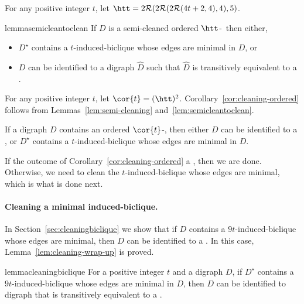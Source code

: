 For any positive integer $t$, let $\htt=2\mathcal{R}(2\mathcal{R}(2\mathcal{R}(4t+2,4),4),5)$.

\begin{restatable}{lemma}{semicleantoclean}
\label{lem:semicleantoclean}
If $D$ is a semi-cleaned ordered $\htt$-\toughpair\ 
then either, 
\begin{itemize}
\item $D^{\star}$ contains a $t$-induced-biclique whose edges are minimal in $D$, or
\item $D$ can be identified to a digraph $\hat{D}$ such that $\hat{D}$ is transitively equivalent to a .
\end{itemize}
\end{restatable}

For any positive integer $t$, let $\cor{t}= (\htt)^2$.
Corollary~\ref{cor:cleaning-ordered} follows from Lemmas~\ref{lem:semi-cleaning} and~\ref{lem:semicleantoclean}.

\begin{corollary}\label{cor:cleaning-ordered}
If a digraph $D$ contains an ordered $\cor{t}$-\toughpair,
then either $D$ can be identified to a , or $D^{\star}$ contains a $t$-induced-biclique whose edges are minimal in $D$.
\end{corollary}

If the outcome of Corollary~\ref{cor:cleaning-ordered} a , then we are done. Otherwise, we need to clean the $t$-induced-biclique whose edges are minimal,
which is what is done next.
\paragraph*{Cleaning a minimal induced-biclique.} In Section~\ref{sec:cleaningbiclique} we show that if $D$ contains a $9t$-induced-biclique whose edges are minimal, then $D$ can be identified to a . In this case, Lemma~\ref{lem:cleaning-wrap-up} is proved.

\begin{restatable}[Cleaning minimal biclique]{lemma}{cleaningbiclique}\label{lem:cleaningbiclique}
For a positive integer $t$ and a digraph $D$, if $D^{\star}$ contains a $9t$-induced-biclique whose edges are minimal in $D$, then $D$ can be identified to digraph that is transitively equivalent to a .
\end{restatable}

